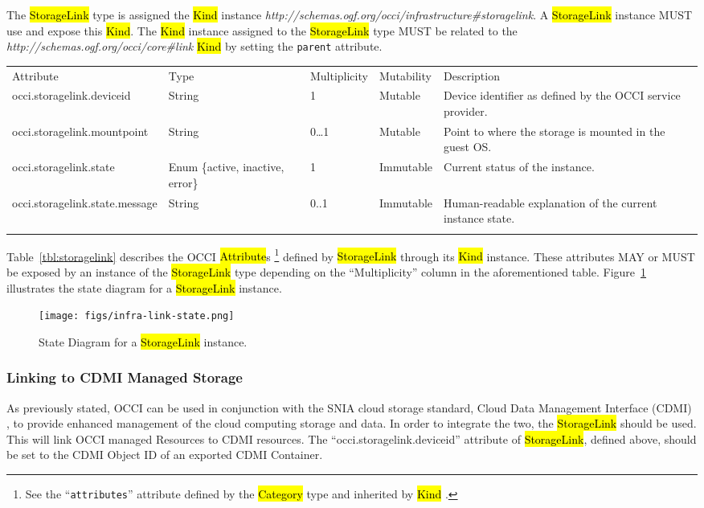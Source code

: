 \documentclass[10pt,a4paper]{article}
\begin{document}
The \hl{StorageLink} type is assigned the \hl{Kind} instance
\textit{http://schemas.ogf.org/occi/infrastructure\#storagelink}.  A
\hl{StorageLink} instance MUST use and expose this \hl{Kind}.  The
\hl{Kind} instance assigned to the \hl{StorageLink} type MUST be
related to the \textit{http://schemas.ogf.org/occi/core\#link}
\hl{Kind} by setting the \texttt{parent} attribute.

{
	\begin{tabular}{lp{2.5cm}p{1cm}lp{5cm}}
	\toprule
	Attribute&Type&Multi\-plicity&Mutability&Description\\
	\colrule
	occi.storagelink.deviceid & String & 1 & Mutable
	& Device identifier as defined by the OCCI service provider.\\
	occi.storagelink.mountpoint & String & 0\ldots1 & Mutable
	& Point to where the storage is mounted in the guest OS.\\
	occi.storagelink.state & Enum \{active, inactive, error\}& 1
	& Immutable & Current status of the instance.\\
	occi.storagelink.state.message & String & 0..1 & Immutable
	& Human-readable explanation of the current instance state.\\
	\botrule
	\end{tabular}
}

Table~\ref{tbl:storagelink} describes the OCCI \hl{Attribute}s%
\footnote{See the ``{\tt attributes}'' attribute defined by the
  \hl{Category} type and inherited by \hl{Kind} \cite{occi:core}.}
defined by \hl{StorageLink} through its \hl{Kind} instance. These
attributes MAY or MUST be exposed by an instance of the \hl{StorageLink} type
depending on the ``Multiplicity'' column in the aforementioned table.
Figure~\ref{fig:storagelink_state} illustrates the state
diagram for a \hl{StorageLink} instance.

\begin{figure}[!h]
	\centering
	\texttt{[image: figs/infra-link-state.png]}
	\caption{State Diagram for a \hl{StorageLink} instance.}
	\label{fig:storagelink_state}
\end{figure}

\subsubsection{Linking to CDMI Managed Storage}
As previously stated, OCCI can be used in conjunction with the SNIA
cloud storage standard, Cloud Data Management Interface (CDMI)
\cite{cdmi}, to provide enhanced management of the cloud computing
storage and data. In order to integrate the two, the
\hl{StorageLink} should be used. This will link OCCI managed Resources
to CDMI resources. The ``occi.storagelink.deviceid'' attribute of
\hl{StorageLink}, defined above, should be set to the CDMI Object ID
of an exported CDMI Container.
\end{document}
